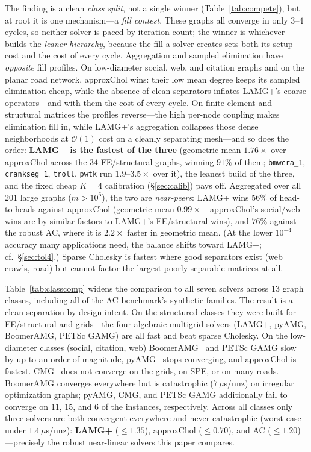 \documentclass[leqno,letterpaper]{etna}
\newcommand{\Oone}{\mathcal{O}(1)}
\begin{document}
The finding is a clean \emph{class split}, not a single winner (Table~\ref{tab:compete}), but at root it is one
mechanism---a \emph{fill contest}. These graphs all converge in only $3$--$4$ cycles, so neither
solver is paced by iteration count; the winner is whichever builds the \emph{leaner hierarchy},
because the fill a solver creates sets both its setup cost and the cost of every cycle. Aggregation
and sampled elimination have \emph{opposite} fill profiles. On low-diameter social, web, and citation
graphs and on the planar road network, approxChol wins: their low mean degree keeps its sampled
elimination cheap, while the absence of clean separators inflates LAMG+'s coarse operators---and with
them the cost of every cycle. On finite-element and structural matrices the profiles reverse---the high per-node
coupling makes elimination fill in, while LAMG+'s aggregation collapses those dense neighborhoods at
$\Oone$ cost on a cleanly separating mesh---and so does the order: \textbf{LAMG+ is the fastest of the three} (geometric-mean
$1.76\times$ over approxChol across the $34$ FE/structural graphs, winning $91\%$ of them;
\texttt{bmwcra\_1}, \texttt{crankseg\_1}, \texttt{troll}, \texttt{pwtk} run $1.9$--$3.5\times$ over
it), the leanest build of the three, and the fixed cheap $K{=}4$ calibration (\S\ref{sec:calib})
pays off. Aggregated over all
$201$ large graphs ($m>10^6$), the two are \emph{near-peers}: LAMG+ wins $56\%$ of head-to-heads
against approxChol (geometric-mean $0.99\times$---approxChol's social/web
wins are by similar factors to LAMG+'s FE/structural wins), and $76\%$ against the robust AC, where
it is $2.2\times$ faster in geometric mean. (At the lower $10^{-4}$ accuracy many applications need, the balance shifts toward LAMG+; cf.~\S\ref{sec:tol4}.) Sparse Cholesky is fastest where good separators exist (web crawls, road)
but cannot factor the largest poorly-separable matrices at all.

Table~\ref{tab:classcomp} widens the comparison to all seven solvers across 13 graph classes,
including all of the AC benchmark's synthetic families. The result is a clean
separation by design intent. On the structured classes they were built for---FE/structural
and grids---the four algebraic-multigrid solvers (LAMG+, pyAMG, BoomerAMG, PETSc GAMG) are all fast
and beat sparse Cholesky. On the low-diameter classes (social, citation, web) BoomerAMG~\cite{boomeramg} and PETSc GAMG slow by up to an order of magnitude, pyAMG~\cite{pyamg}
stops converging, and approxChol is fastest. CMG~\cite{cmg} does not converge on the grids,
on SPE, or on many roads. BoomerAMG converges everywhere but is catastrophic ($7\,\mu$s/nnz) on
irregular optimization graphs; pyAMG, CMG, and PETSc GAMG additionally fail to converge on $11$, $15$, and $6$ of
the instances, respectively. Across all classes only three solvers are both convergent
everywhere and never catastrophic (worst case under $1.4\,\mu$s/nnz): \textbf{LAMG+}
($\le1.35$), approxChol ($\le0.70$), and AC ($\le1.20$)---precisely the robust near-linear
solvers this paper compares.
\end{document}
